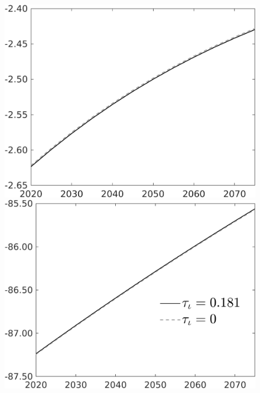 \begin{figure}[h!!]
\begin{minipage}[]{0.32\textwidth}
	\includegraphics[width=1\textwidth]{../../codding_model/own_basedOnFried/optimalPol_010922_revision/figures/all_13Sept22/PerdifNoTauf_regime0_CompTaul_sn_spillover0_nsk0_xgr0_knspil0_sep0_LFlimit0_emsbase0_countec0_GovRev0_etaa0.79_lgd0.png}
\end{minipage}\begin{minipage}[]{0.32\textwidth}
\includegraphics[width=1\textwidth]{../../codding_model/own_basedOnFried/optimalPol_010922_revision/figures/all_13Sept22/PerdifNoTauf_regime0_CompTaul_sff_spillover0_nsk0_xgr0_knspil0_sep0_LFlimit0_emsbase0_countec0_GovRev0_etaa0.79_lgd1.png}
\end{minipage}

\end{figure}
